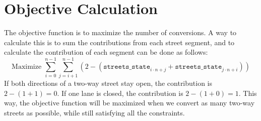 \section*{Objective Calculation}
The objective function is to maximize the number of conversions. A way to calculate this is to sum the contributions from each street segment, and to calculate the contribution of each segment can be done as follows:
\begin{equation}
    \text{Maximize } \sum_{i=0}^{n-1} \sum_{j=i+1}^{n-1} \left( 2 - (\texttt{streets\_state}_{i \cdot n + j} + \texttt{streets\_state}_{j \cdot n + i}) \right)
\end{equation}
If both directions of a two-way street stay open, the contribution is $2 - (1+1) = 0$. If one lane is closed, the contribution is $2 - (1+0) = 1$. 
This way, the objective function will be maximized when we convert as many two-way streets as possible, while still satisfying all the constraints.
